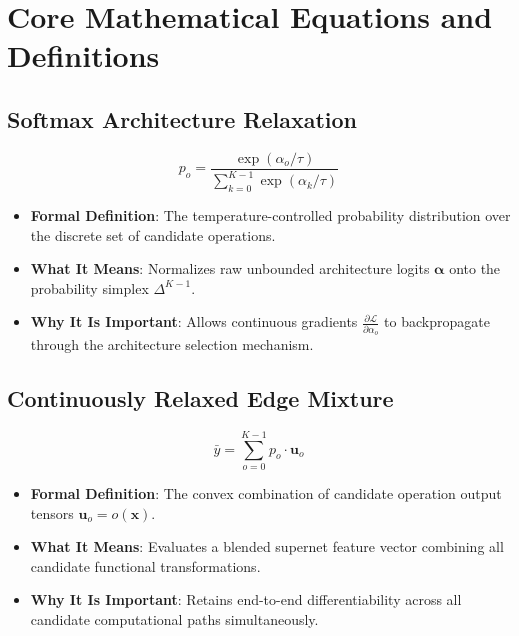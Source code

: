 \documentclass[11pt,a4paper]{article}
\theoremstyle{definition}
\begin{document}
\section{Core Mathematical Equations and Definitions}

\subsection{Softmax Architecture Relaxation}
{\boldmath
\begin{equation}
p_o = \frac{\exp(\alpha_o / \tau)}{\sum_{k=0}^{K-1} \exp(\alpha_k / \tau)}
\end{equation}
}
\begin{itemize}
    \item \textbf{Formal Definition}: The temperature-controlled probability distribution over the discrete set of candidate operations.
    \item \textbf{What It Means}: Normalizes raw unbounded architecture logits $\boldsymbol{\alpha}$ onto the probability simplex $\Delta^{K-1}$.
    \item \textbf{Why It Is Important}: Allows continuous gradients $\frac{\partial \mathcal{L}}{\partial \alpha_o}$ to backpropagate through the architecture selection mechanism.
\end{itemize}

\subsection{Continuously Relaxed Edge Mixture}
{\boldmath
\begin{equation}
\bar{y} = \sum_{o=0}^{K-1} p_o \cdot \mathbf{u}_o
\end{equation}
}
\begin{itemize}
    \item \textbf{Formal Definition}: The convex combination of candidate operation output tensors $\mathbf{u}_o = o(\mathbf{x})$.
    \item \textbf{What It Means}: Evaluates a blended supernet feature vector combining all candidate functional transformations.
    \item \textbf{Why It Is Important}: Retains end-to-end differentiability across all candidate computational paths simultaneously.
\end{itemize}
\end{document}
